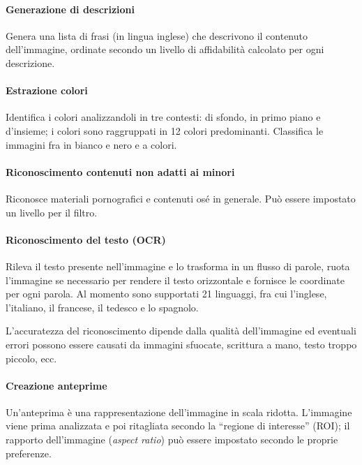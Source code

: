 \paragraph{Generazione di descrizioni} Genera una lista di frasi (in lingua inglese) che descrivono il contenuto dell'immagine, ordinate secondo un livello di affidabilità calcolato per ogni descrizione.

\paragraph{Estrazione colori} Identifica i colori analizzandoli in tre contesti: di sfondo, in primo piano e d'insieme; i colori sono raggruppati in 12 colori predominanti. Classifica le immagini fra in bianco e nero e a colori.

\paragraph{Riconoscimento contenuti non adatti ai minori} Riconosce materiali pornografici e contenuti osé in generale. Può essere impostato un livello per il filtro.

\paragraph{Riconoscimento del testo (OCR)} Rileva il testo presente nell'immagine e lo trasforma in un flusso di parole, ruota l'immagine se necessario per rendere il testo orizzontale e fornisce le coordinate per ogni parola. Al momento sono supportati 21 linguaggi, fra cui l'inglese, l'italiano, il francese, il tedesco e lo spagnolo.

L'accuratezza del riconoscimento dipende dalla qualità dell'immagine ed eventuali errori possono essere causati da immagini sfuocate, scrittura a mano, testo troppo piccolo, ecc.

\paragraph{Creazione anteprime} Un'anteprima è una rappresentazione dell'immagine in scala ridotta. L'immagine viene prima analizzata e poi ritagliata secondo la ``regione di interesse'' (ROI); il rapporto dell'immagine (\textit{aspect ratio}) può essere impostato secondo le proprie preferenze.

